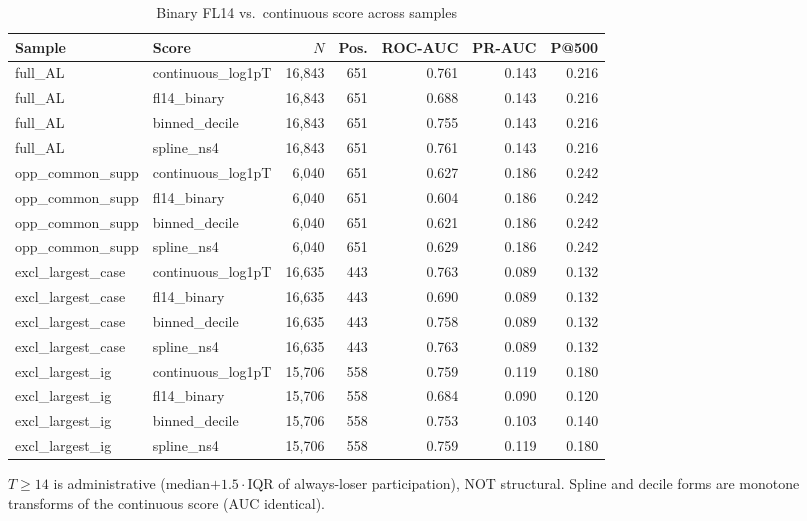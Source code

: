 \begin{table}[htbp]\centering\footnotesize
\caption{Binary FL14 vs.\ continuous score across samples}
\label{tab:binary_vs_continuous}
\begin{tabular}{llrrrrr}\hline
Sample & Score & $N$ & Pos. & ROC-AUC & PR-AUC & P@500 \\\hline
full\_AL & continuous\_log1pT & 16,843 & 651 & 0.761 & 0.143 & 0.216 \\
full\_AL & fl14\_binary & 16,843 & 651 & 0.688 & 0.143 & 0.216 \\
full\_AL & binned\_decile & 16,843 & 651 & 0.755 & 0.143 & 0.216 \\
full\_AL & spline\_ns4 & 16,843 & 651 & 0.761 & 0.143 & 0.216 \\
opp\_common\_supp & continuous\_log1pT & 6,040 & 651 & 0.627 & 0.186 & 0.242 \\
opp\_common\_supp & fl14\_binary & 6,040 & 651 & 0.604 & 0.186 & 0.242 \\
opp\_common\_supp & binned\_decile & 6,040 & 651 & 0.621 & 0.186 & 0.242 \\
opp\_common\_supp & spline\_ns4 & 6,040 & 651 & 0.629 & 0.186 & 0.242 \\
excl\_largest\_case & continuous\_log1pT & 16,635 & 443 & 0.763 & 0.089 & 0.132 \\
excl\_largest\_case & fl14\_binary & 16,635 & 443 & 0.690 & 0.089 & 0.132 \\
excl\_largest\_case & binned\_decile & 16,635 & 443 & 0.758 & 0.089 & 0.132 \\
excl\_largest\_case & spline\_ns4 & 16,635 & 443 & 0.763 & 0.089 & 0.132 \\
excl\_largest\_ig & continuous\_log1pT & 15,706 & 558 & 0.759 & 0.119 & 0.180 \\
excl\_largest\_ig & fl14\_binary & 15,706 & 558 & 0.684 & 0.090 & 0.120 \\
excl\_largest\_ig & binned\_decile & 15,706 & 558 & 0.753 & 0.103 & 0.140 \\
excl\_largest\_ig & spline\_ns4 & 15,706 & 558 & 0.759 & 0.119 & 0.180 \\
\hline\end{tabular}
\begin{tablenotes}\footnotesize\item $T\!\ge\!14$ is administrative (median$+1.5\cdot$IQR of always-loser participation), NOT structural. Spline and decile forms are monotone transforms of the continuous score (AUC identical).\end{tablenotes}
\end{table}
